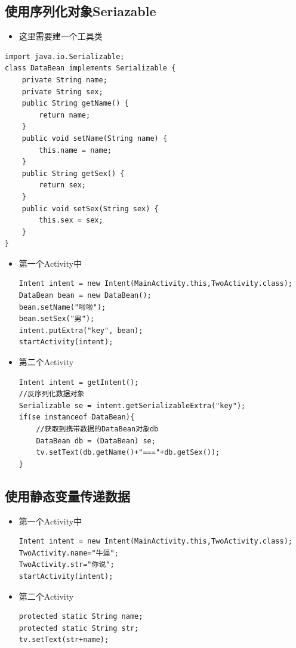 \documentclass[9pt, b5paaper]{book}
\begin{document}
\subsection{使用序列化对象Seriazable}
\label{sec-1-6-5}
\begin{itemize}
\item 这里需要建一个工具类
\end{itemize}
\begin{verbatim}
import java.io.Serializable;
class DataBean implements Serializable {
    private String name;
    private String sex;
    public String getName() {
        return name;
    }
    public void setName(String name) {
        this.name = name;
    }
    public String getSex() {
        return sex;
    }
    public void setSex(String sex) {
        this.sex = sex;
    }
}
\end{verbatim}
\begin{itemize}
\item 第一个Activity中
\begin{verbatim}
Intent intent = new Intent(MainActivity.this,TwoActivity.class);
DataBean bean = new DataBean();
bean.setName("啦啦");
bean.setSex("男");
intent.putExtra("key", bean);
startActivity(intent);
\end{verbatim}
\item 第二个Activity
\begin{verbatim}
Intent intent = getIntent();
//反序列化数据对象
Serializable se = intent.getSerializableExtra("key");
if(se instanceof DataBean){
    //获取到携带数据的DataBean对象db
    DataBean db = (DataBean) se;
    tv.setText(db.getName()+"==="+db.getSex());
}
\end{verbatim}
\end{itemize}
\subsection{使用静态变量传递数据}
\label{sec-1-6-6}
\begin{itemize}
\item 第一个Activity中
\begin{verbatim}
Intent intent = new Intent(MainActivity.this,TwoActivity.class);
TwoActivity.name="牛逼";
TwoActivity.str="你说";
startActivity(intent);
\end{verbatim}
\item 第二个Activity
\begin{verbatim}
protected static String name;
protected static String str;
tv.setText(str+name);
\end{verbatim}
\end{itemize}
\end{document}
